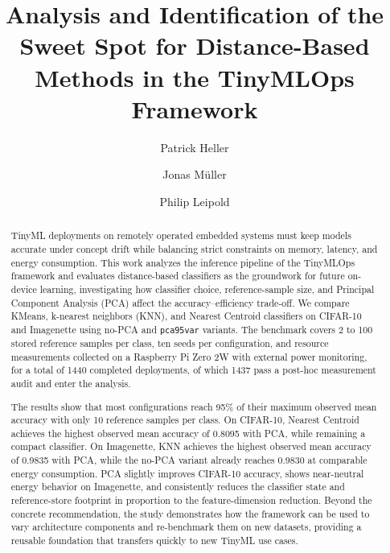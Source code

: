 \documentclass[sigconf,review,nonacm]{acmart}
\begin{document}
\title{Analysis and Identification of the Sweet Spot for Distance-Based Methods in the TinyMLOps Framework}

\author{Patrick Heller}
\author{Jonas M{\"u}ller}
\author{Philip Leipold}

\renewcommand{\shortauthors}{Heller et al.}

\begin{abstract}
TinyML deployments on remotely operated embedded systems must keep models accurate under concept drift while balancing strict constraints on memory, latency, and energy consumption.
This work analyzes the inference pipeline of the TinyMLOps framework and evaluates distance-based classifiers as the groundwork for future on-device learning, investigating how classifier choice, reference-sample size, and Principal Component Analysis (PCA) affect the accuracy--efficiency trade-off.
We compare KMeans, k-nearest neighbors (KNN), and Nearest Centroid classifiers on CIFAR-10 and Imagenette using no-PCA and \texttt{pca95var} variants.
The benchmark covers 2 to 100 stored reference samples per class, ten seeds per configuration, and resource measurements collected on a Raspberry Pi Zero 2W with external power monitoring, for a total of 1440 completed deployments, of which 1437 pass a post-hoc measurement audit and enter the analysis.

The results show that most configurations reach 95\% of their maximum observed mean accuracy with only 10 reference samples per class.
On CIFAR-10, Nearest Centroid achieves the highest observed mean accuracy of 0.8095 with PCA, while remaining a compact classifier.
On Imagenette, KNN achieves the highest observed mean accuracy of 0.9835 with PCA, while the no-PCA variant already reaches 0.9830 at comparable energy consumption.
PCA slightly improves CIFAR-10 accuracy, shows near-neutral energy behavior on Imagenette, and consistently reduces the classifier state and reference-store footprint in proportion to the feature-dimension reduction.
Beyond the concrete recommendation, the study demonstrates how the framework can be used to vary architecture components and re-benchmark them on new datasets, providing a reusable foundation that transfers quickly to new TinyML use cases.
\end{abstract}
\end{document}

